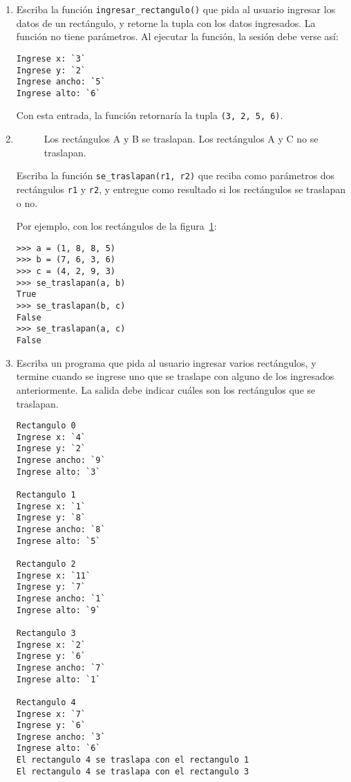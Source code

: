 \begin{enumerate}
\item
  Escriba la función \lstinline!ingresar_rectangulo()! que pida al
  usuario ingresar los datos de un rectángulo, y retorne la tupla con
  los datos ingresados. La función no tiene parámetros. Al ejecutar la
  función, la sesión debe verse así:

\begin{lstlisting}[language=testcase]
Ingrese x: `3`
Ingrese y: `2`
Ingrese ancho: `5`
Ingrese alto: `6`
\end{lstlisting}

  Con esta entrada, la función retornaría la tupla
  \lstinline!(3, 2, 5, 6)!.
\item

  \begin{figure}
    \centering
    
    \caption{Los rectángulos A y B se traslapan.
      Los rectángulos A y C no se traslapan.}
    \label{fig:rect2}
  \end{figure}

  Escriba la función \lstinline!se_traslapan(r1, r2)! que reciba como
  parámetros dos rectángulos \lstinline!r1! y \lstinline!r2!, y entregue
  como resultado si los rectángulos se traslapan o no.

  Por ejemplo, con los rectángulos de la figura~\ref{fig:rect2}:
\begin{lstlisting}
>>> a = (1, 8, 8, 5)
>>> b = (7, 6, 3, 6)
>>> c = (4, 2, 9, 3)
>>> se_traslapan(a, b)
True
>>> se_traslapan(b, c)
False
>>> se_traslapan(a, c)
False
\end{lstlisting}
\item
  Escriba un programa que pida al usuario ingresar varios rectángulos, y
  termine cuando se ingrese uno que se traslape con alguno de los
  ingresados anteriormente. La salida debe indicar cuáles son los
  rectángulos que se traslapan.

\begin{lstlisting}[language=testcase]
Rectangulo 0
Ingrese x: `4`
Ingrese y: `2`
Ingrese ancho: `9`
Ingrese alto: `3`

Rectangulo 1
Ingrese x: `1`
Ingrese y: `8`
Ingrese ancho: `8`
Ingrese alto: `5`

Rectangulo 2
Ingrese x: `11`
Ingrese y: `7`
Ingrese ancho: `1`
Ingrese alto: `9`

Rectangulo 3
Ingrese x: `2`
Ingrese y: `6`
Ingrese ancho: `7`
Ingrese alto: `1`

Rectangulo 4
Ingrese x: `7`
Ingrese y: `6`
Ingrese ancho: `3`
Ingrese alto: `6`
El rectangulo 4 se traslapa con el rectangulo 1
El rectangulo 4 se traslapa con el rectangulo 3
\end{lstlisting}


\end{enumerate}
